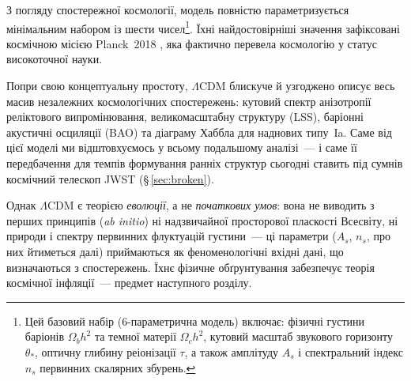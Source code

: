 \documentclass[12pt, a4paper]{article}
\begin{document}
З погляду спостережної космології, модель повністю параметризується
мінімальним набором із шести чисел\footnote{Цей базовий набір
($6$-параметрична модель) включає: фізичні густини баріонів $\Omega_b h^2$
та темної матерії $\Omega_c h^2$, кутовий масштаб звукового горизонту
$\theta_\ast$, оптичну глибину реіонізації $\tau$, а також амплітуду $A_s$
і спектральний індекс $n_s$ первинних скалярних збурень.}. Їхні найдостовірніші
значення зафіксовані космічною місією Planck~2018 \cite{planck_2018}, яка
фактично перевела космологію у статус високоточної науки.

Попри свою концептуальну простоту, $\Lambda$CDM блискуче й узгоджено
описує весь масив незалежних космологічних спостережень: кутовий спектр
анізотропії реліктового випромінювання, великомасштабну структуру (LSS),
баріонні акустичні осциляції (BAO) та діаграму Хаббла для наднових типу~Ia.
Саме від цієї моделі ми відштовхуємось у всьому подальшому аналізі~--- і
саме її передбачення для темпів формування ранніх структур сьогодні
ставить під сумнів космічний телескоп JWST (§\,\ref{sec:broken}).

Однак $\Lambda$CDM є теорією \emph{еволюції}, а не
\emph{початкових умов}: вона не виводить з перших принципів (\emph{ab initio})
ні надзвичайної просторової пласкості Всесвіту, ні природи
і спектру первинних флуктуацій густини~--- ці параметри
($A_s$, $n_s$, про них йтиметься далі) приймаються як феноменологічні вхідні дані,
що визначаються з спостережень. Їхнє фізичне обґрунтування
забезпечує теорія космічної інфляції~--- предмет наступного розділу.

%
\end{document}
